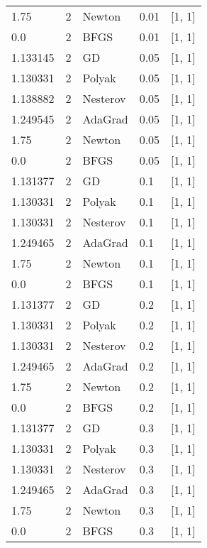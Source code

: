 \begin{tabular}{lllll}
     1.75 &        2 &   Newton &   0.01 &           [1, 1] \\
      0.0 &        2 &     BFGS &   0.01 &           [1, 1] \\
 1.133145 &        2 &       GD &   0.05 &           [1, 1] \\
 1.130331 &        2 &   Polyak &   0.05 &           [1, 1] \\
 1.138882 &        2 & Nesterov &   0.05 &           [1, 1] \\
 1.249545 &        2 &  AdaGrad &   0.05 &           [1, 1] \\
     1.75 &        2 &   Newton &   0.05 &           [1, 1] \\
      0.0 &        2 &     BFGS &   0.05 &           [1, 1] \\
 1.131377 &        2 &       GD &    0.1 &           [1, 1] \\
 1.130331 &        2 &   Polyak &    0.1 &           [1, 1] \\
 1.130331 &        2 & Nesterov &    0.1 &           [1, 1] \\
 1.249465 &        2 &  AdaGrad &    0.1 &           [1, 1] \\
     1.75 &        2 &   Newton &    0.1 &           [1, 1] \\
      0.0 &        2 &     BFGS &    0.1 &           [1, 1] \\
 1.131377 &        2 &       GD &    0.2 &           [1, 1] \\
 1.130331 &        2 &   Polyak &    0.2 &           [1, 1] \\
 1.130331 &        2 & Nesterov &    0.2 &           [1, 1] \\
 1.249465 &        2 &  AdaGrad &    0.2 &           [1, 1] \\
     1.75 &        2 &   Newton &    0.2 &           [1, 1] \\
      0.0 &        2 &     BFGS &    0.2 &           [1, 1] \\
 1.131377 &        2 &       GD &    0.3 &           [1, 1] \\
 1.130331 &        2 &   Polyak &    0.3 &           [1, 1] \\
 1.130331 &        2 & Nesterov &    0.3 &           [1, 1] \\
 1.249465 &        2 &  AdaGrad &    0.3 &           [1, 1] \\
     1.75 &        2 &   Newton &    0.3 &           [1, 1] \\
      0.0 &        2 &     BFGS &    0.3 &           [1, 1] \\

\end{tabular}

